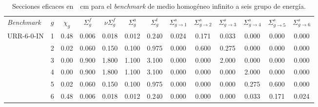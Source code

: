\documentclass[11pt]{article}
\numberwithin{equation}{section}
\begin{document}
{
\begin{table}[ht!]
\begin{center}
\begin{tabular}{lcccccccccccc}
\small \emph{Benchmark}  & \small $g$ & \small $\chi_g$ & \small $\Sigma^{f}_g$ & \small $\nu\Sigma^{f}_g$ & \small $\Sigma^{a}_g$ & \small $\Sigma^{t}_g$ & \small $\Sigma^s_{g \rightarrow 1}$ & \small $\Sigma^s_{g \rightarrow 2}$ & \small $\Sigma^s_{g \rightarrow 3}$ & \small $\Sigma^s_{g \rightarrow 4}$ & \small $\Sigma^s_{g \rightarrow 5}$ & \small $\Sigma^s_{g \rightarrow 6}$ \\
\small{URR-6-0-IN} & \tiny \num{1} & \tiny \num{0.48} & \tiny \num{0.006} & \tiny \num{0.018} & \tiny \num{0.012} & \tiny \num{0.240} & \tiny \num{0.024} & \tiny \num{0.171} & \tiny \num{0.033} & \tiny \num{0.000} & \tiny \num{0.000} & \tiny \num{0.000} \\
           & \tiny \num{2} & \tiny \num{0.02} & \tiny \num{0.060} & \tiny \num{0.150} & \tiny \num{0.100} & \tiny \num{0.975} & \tiny \num{0.000} & \tiny \num{0.600} & \tiny \num{0.275} & \tiny \num{0.000} & \tiny \num{0.000} & \tiny \num{0.000} \\
           & \tiny \num{3} & \tiny \num{0.00} & \tiny \num{0.900} & \tiny \num{1.800} & \tiny \num{1.100} & \tiny \num{3.100} & \tiny \num{0.000} & \tiny \num{0.000} & \tiny \num{2.000} & \tiny \num{0.000} & \tiny \num{0.000} & \tiny \num{0.000} \\
           & \tiny \num{4} & \tiny \num{0.00} & \tiny \num{0.900} & \tiny \num{1.800} & \tiny \num{1.100} & \tiny \num{3.100} & \tiny \num{0.000} & \tiny \num{0.000} & \tiny \num{0.000} & \tiny \num{2.000} & \tiny \num{0.000} & \tiny \num{0.000} \\
           & \tiny \num{5} & \tiny \num{0.02} & \tiny \num{0.060} & \tiny \num{0.150} & \tiny \num{0.100} & \tiny \num{0.975} & \tiny \num{0.000} & \tiny \num{0.000} & \tiny \num{0.000} & \tiny \num{0.275} & \tiny \num{0.600} & \tiny \num{0.000} \\
           & \tiny \num{6} & \tiny \num{0.48} & \tiny \num{0.006} & \tiny \num{0.018} & \tiny \num{0.012} & \tiny \num{0.240} & \tiny \num{0.000} & \tiny \num{0.000} & \tiny \num{0.000} & \tiny \num{0.033} & \tiny \num{0.171} & \tiny \num{0.024} 
\end{tabular}
\caption{\label{tabla:xs-urr} Secciones eficaces en~\si{\per\centi\metre} para el \emph{benchmark} de medio homogéneo infinito a seis grupo de energía.}
\end{center}
\end{table}
}
\end{document}
